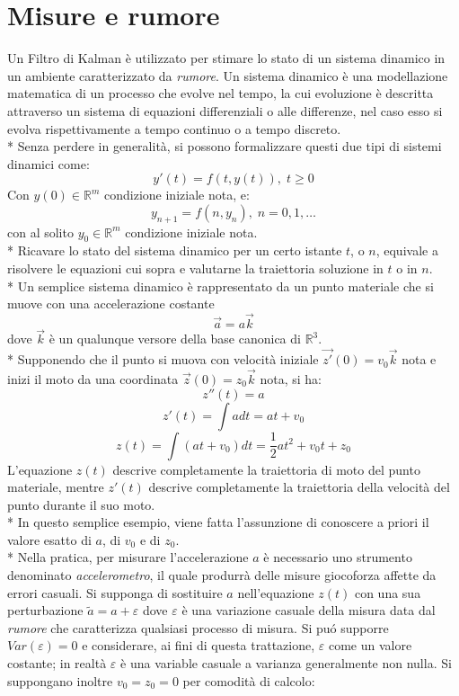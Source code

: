 \section{Misure e rumore}
Un Filtro di Kalman \`e utilizzato per stimare lo stato di un sistema dinamico in un ambiente caratterizzato da \emph{rumore}.
Un sistema dinamico \`e una modellazione matematica di un processo che evolve nel tempo, la cui evoluzione \`e descritta attraverso un sistema di equazioni differenziali o alle differenze, nel caso esso si evolva rispettivamente a tempo continuo o a tempo discreto.\\*
Senza perdere in generalit\`a, si possono formalizzare questi due tipi di sistemi dinamici come:
$$
y'(t) = f(t,y(t)),\;t\ge 0
$$
Con $y(0) \in \mathbb{R}^m$ condizione iniziale nota, e:
$$
y_{n+1} = f(n,y_n),\;n = 0,1,\dots
$$
con al solito $y_0 \in \mathbb{R}^m$ condizione iniziale nota.\\*
Ricavare lo stato del sistema dinamico per un certo istante $t$, o $n$, equivale a risolvere le equazioni cui sopra e valutarne la traiettoria soluzione in $t$ o in $n$.\\*
Un semplice sistema dinamico \`e rappresentato da un punto materiale che si muove con una accelerazione costante $$\vec{a} = a\vec{k}$$ dove $\vec{k}$ \`e un qualunque versore della base canonica di $\mathbb{R}^3$.\\*
Supponendo che il punto si muova con velocit\`a iniziale $\vec{z'}(0) = v_0\vec{k}$ nota e inizi il moto da una coordinata $\vec z(0) = z_0\vec{k}$ nota, si ha:
$$
z''(t) = a
$$
$$
z'(t) = \int{a dt} = a t + v_0
$$
$$
z(t) = \int(a t + v_0)dt = \frac{1}{2} at^2 +  v_0 t + z_0
$$
L'equazione $z(t)$ descrive completamente la traiettoria di moto del punto materiale, mentre $z'(t)$ descrive completamente la traiettoria della velocit\`a del punto durante il suo moto.\\*
In questo semplice esempio, viene fatta l'assunzione di conoscere a priori il valore esatto di $a$, di $v_0$ e di $z_0$.\\*
Nella pratica, per misurare l'accelerazione $a$ \`e necessario uno strumento denominato \emph{accelerometro}, il quale produrr\`a delle misure giocoforza affette da errori casuali. Si supponga di sostituire $a$ nell'equazione $z(t)$ con una sua perturbazione $\tilde{a} = a + \varepsilon$ dove $\varepsilon$ \`e una variazione casuale della misura data dal \emph{rumore} che caratterizza qualsiasi processo di misura. Si pu\'o supporre $Var(\varepsilon) = 0$ e considerare, ai fini di questa trattazione, $\varepsilon$ come un valore costante; in realt\`a $\varepsilon$ \`e una variable casuale a varianza generalmente non nulla. Si suppongano inoltre $v_0 = z_0 = 0$ per comodit\`a di calcolo:
